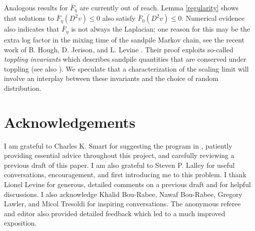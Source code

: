 \documentclass[12pt]{amsart}
\begin{document}
Analogous results for $\bar{F}_{\eta}$ are currently out of reach. Lemma \ref{regularity} shows that solutions to $\bar{F}_\eta(D^2 v ) \leq 0$ also satisfy $\bar{F}_0(D^2 v) \leq 0$. Numerical evidence also indicates that $\bar{F}_{\eta}$ is not always the Laplacian; one reason for this may be the extra log factor in the mixing time of the sandpile Markov chain, see the recent work of B. Hough, D. Jerison, and L. Levine \cite{hough2019sandpiles}. Their proof exploits so-called {\it toppling invariants} 
which describes sandpile quantities that are conserved under toppling (see also \cite{dhar1995algebraic}). We speculate that a characterization of the scaling limit will involve an interplay between these invariants and the choice of random distribution.





\section*{Acknowledgements}
I am grateful to Charles K. Smart for suggesting the program in \cite{armstrong2014quantitative}, patiently providing essential advice throughout this project, and carefully reviewing a previous draft of this paper.
I am also grateful to Steven P. Lalley for useful conversations, encouragement, and first introducing me to this problem. I thank Lionel Levine for generous, detailed comments on a previous draft 
and for helpful discussions. I also acknowledge Khalid Bou-Rabee, Nawaf Bou-Rabee, Gregory Lawler, and Micol Tresoldi for inspiring conversations.  The anonymous referee and editor also provided detailed feedback which led to a much improved exposition.


{}

\end{document}

